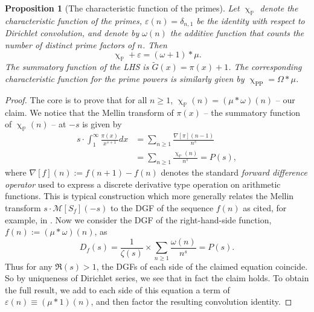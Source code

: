 \documentclass[11pt,reqno,a4letter]{article}
\numberwithin{figure}{section}
\numberwithin{table}{section}
\renewcommand{\chi}{\upchi}
\theoremstyle{plain}
\newtheorem{prop}[theorem]{Proposition}
\numberwithin{theorem}{section}
\theoremstyle{definition}
\begin{document}
\begin{prop}[The characteristic function of the primes] 
\label{prop_AntiqueDivisorSumIdent} 
Let $\chi_{\mathbb{P}}$ denote the characteristic function of the primes, 
$\varepsilon(n) = \delta_{n,1}$ be the identity with respect to Dirichlet convolution, 
and denote by $\omega(n)$ the additive function that counts the number of 
distinct prime factors of $n$. 
Then 
$$\chi_{\mathbb{P}} + \varepsilon = (\omega + 1) \ast \mu.$$ 
The summatory function of the LHS is $\widetilde{G}(x) = \pi(x)+1$. 
The corresponding characteristic function for the prime powers is similarly given by 
$\chi_{\operatorname{PP}} = \Omega \ast \mu$. 
\end{prop}
\begin{proof} 
The core is to prove that for all $n \geq 1$, 
$\chi_{\mathbb{P}}(n) = (\mu \ast \omega)(n)$ -- our claim. 
We notice that the Mellin transform of $\pi(x)$ -- the summatory function of 
$\chi_{\mathbb{P}}(n)$ -- at $-s$ is given by 
\begin{align*} 
s \cdot \int_1^{\infty} \frac{\pi(x)}{x^{s+1}} dx & = \sum_{n \geq 1} \frac{\nabla[\pi](n-1)}{n^s} \\ 
     & = \sum_{n \geq 1} \frac{\chi_{\mathbb{P}}(n)}{n^s} = P(s), 
\end{align*} 
where $\nabla[f](n) := f(n+1) - f(n)$ denotes the standard 
\emph{forward difference operator} used to express a discrete derivative type operation on 
arithmetic functions. 
This is typical construction which more generally relates the Mellin transform 
$s \cdot \mathcal{M}[S_f](-s)$ to the 
DGF of the sequence $f(n)$ as cited, for example, in \cite[\S 11]{APOSTOLANUMT}. Now we consider the 
DGF of the right-hand-side function, $f(n) := (\mu \ast \omega)(n)$, as 
\[
D_f(s) = \frac{1}{\zeta(s)} \times \sum_{n \geq 1} \frac{\omega(n)}{n^s} = P(s).  
\]
Thus for any $\Re(s) > 1$, the DGFs of each side of the 
claimed equation coincide. So by uniqueness of Dirichlet series, we see that in fact the claim 
holds. To obtain the full result, we add to each side of this equation a term of 
$\varepsilon(n) \equiv (\mu \ast 1)(n)$, and then factor the resulting convolution identity. 
\end{proof} 
\end{document}
